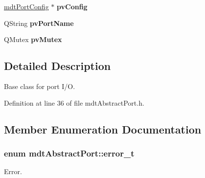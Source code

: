 \begin{DoxyCompactItemize}
\item 
\hypertarget{classmdt_abstract_port_a035d72bddbac47f405a8ecf0d2eeba66}{
\hyperlink{classmdt_port_config}{mdtPortConfig} $\ast$ {\bfseries pvConfig}}
\label{classmdt_abstract_port_a035d72bddbac47f405a8ecf0d2eeba66}

\item 
\hypertarget{classmdt_abstract_port_afb8f8a723ff2db5141f18750020a7ee9}{
QString {\bfseries pvPortName}}
\label{classmdt_abstract_port_afb8f8a723ff2db5141f18750020a7ee9}

\item 
\hypertarget{classmdt_abstract_port_a357bce65bc031fffa87090a26ab88a08}{
QMutex {\bfseries pvMutex}}
\label{classmdt_abstract_port_a357bce65bc031fffa87090a26ab88a08}

\end{DoxyCompactItemize}


\subsection{Detailed Description}
Base class for port I/O. 

Definition at line 36 of file mdtAbstractPort.h.



\subsection{Member Enumeration Documentation}
\hypertarget{classmdt_abstract_port_ad4121bb930c95887e77f8bafa065a85e}{
\subsubsection[{error\_\-t}]{\setlength{\rightskip}{0pt plus 5cm}enum {\bf mdtAbstractPort::error\_\-t}}}
\label{classmdt_abstract_port_ad4121bb930c95887e77f8bafa065a85e}


Error. 

